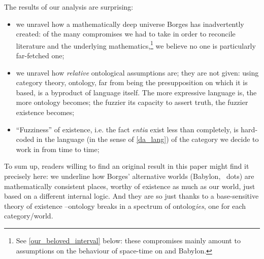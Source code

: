 The results of our analysis are surprising:
\begin{itemize}
  \item we unravel how a mathematically deep universe Borges has inadvertently created: of the many compromises we had to take in order to reconcile literature and the underlying mathematics,\footnote{See \autoref{our_beloved_interval} below: these compromises mainly amount to assumptions on the behaviour of space-time on \tlon and Babylon.} we believe no one is particularly far-fetched one;
  \item we unravel how \emph{relative} ontological assumptions are; they are not given: using category theory, ontology, far from being the presupposition on which it is based, is a byproduct of language itself. The more expressive language is, the more ontology becomes; the fuzzier its capacity to assert truth, the fuzzier existence becomes;
  \item ``Fuzziness'' of existence, i.e. the fact \emph{entia} exist less than completely, is hard-coded in the language (in the sense of \autoref{da_lang}) of the category we decide to work in from time to time;
\end{itemize}
To sum up, readers willing to find an original result in this paper might find it precisely here: we underline how Borges' alternative worlds (Babylon, \tlon \ dots) are mathematically consistent places, worthy of existence as much as our world, just based on a different internal logic. And they are so just thanks to a base-sensitive theory of existence --ontology breaks in a spectrum of ontolog\emph{ies}, one for each category/world.

